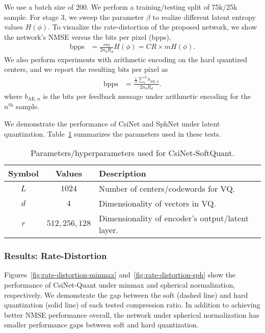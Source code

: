 We use a batch size of 200. We perform a training/testing split of 75k/25k sample. For stage 3, we sweep the parameter $\beta$ to realize different latent entropy values $H(\phi)$. To visualize the rate-distortion of the proposed network, we show the network's NMSE versus the bits per pixel (bpps), 
\begin{align*}
	\text{bpps}	 &= \frac{rm}{2 n_{b}R_{d}}H(\phi) = CR\times mH(\phi). %
\end{align*}
We also perform experiments with arithmetic encoding on the hard quantized centers, and we report the resulting bits per pixel as
\begin{align*}
	\text{bpps}	 &= \frac{\frac 1N \sum_{i}^N b_{\text{AE},n}}{2 n_{b}R_{d}}. %
\end{align*}
where $b_{\text{AE},n}$ is the bits per feedback message under arithmetic encoding for the $n^{\text{th}}$ sample.

We demonstrate the performance of CsiNet and SphNet under latent quantization. Table~\ref{tab:quant-params} summarizes the parameters used in these tests. %

\begin{table}[]
\centering
\caption{Parameters/hyperparameters used for CsiNet-SoftQuant.}
\label{tab:quant-params}
\begin{tabular}{c|c|l}
\toprule
\textbf{Symbol}   & \textbf{Values}  & \textbf{Description} \\ \midrule
$L$ 		  	  & $1024$	 		 & Number of centers/codewords for VQ.  \\ \hline
$d$               & $4$				 & Dimensionality of vectors in VQ.  \\ \hline
$r$               & $512,256,128$	 & Dimensionality of encoder's output/latent layer.  \\ \hline
\end{tabular}
\end{table}

\subsubsection{Results: Rate-Distortion} \label{sec:results-rate-distortion}

Figures~\ref{fig:rate-distortion-minmax} and~\ref{fig:rate-distortion-sph} show the performance of CsiNet-Quant under minmax and spherical normalization, respectively. We demonstrate the gap between the soft (dashed line) and hard quantization (solid line) of each tested compression ratio. In addition to achieving better NMSE performance overall, the network under spherical normalization has smaller performance gaps between soft and hard quantization.

